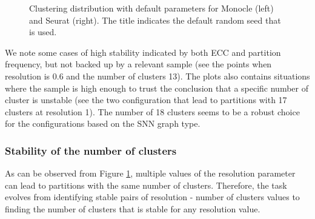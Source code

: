\begin{figure}[H]
    \centering
    \caption{\label{fig:ca-1-kres}Clustering distribution with default parameters for Monocle (left) and Seurat (right). The title indicates the default random seed that is used.}
\end{figure}


We note some cases of high stability indicated by both ECC and partition frequency, but not backed up by a relevant sample (see the points when resolution is 0.6 and the number of clusters 13). The plots also contains situations where the sample is high enough to trust the conclusion that a specific number of cluster is unstable (see the two configuration that lead to partitions with 17 clusters at resolution 1). The number of 18 clusters seems to be a robust choice for the configurations based on the SNN graph type.



\subsubsection{Stability of the number of clusters}
As can be observed from Figure \ref{fig:ca-1-kres}, multiple values of the resolution parameter can lead to partitions with the same number of clusters. Therefore, the task evolves from identifying stable pairs of resolution - number of clusters values to finding the number of clusters that is stable for any resolution value.

